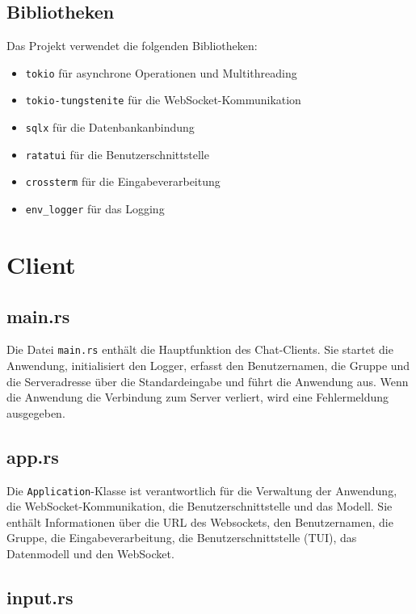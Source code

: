 \documentclass[a4paper]{article}
\begin{document}
\subsection{Bibliotheken}

Das Projekt verwendet die folgenden Bibliotheken:

\begin{itemize}
    \setlength\itemsep{0em}
    \item \texttt{tokio} für asynchrone Operationen und Multithreading
    \item \texttt{tokio-tungstenite} für die WebSocket-Kommunikation
    \item \texttt{sqlx} für die Datenbankanbindung
    \item \texttt{ratatui} für die Benutzerschnittstelle
    \item \texttt{crossterm} für die Eingabeverarbeitung
    \item \texttt{env\_logger} für das Logging
\end{itemize}

\newpage

\section{Client}

\subsection{main.rs}

Die Datei \texttt{main.rs} enthält die Hauptfunktion des Chat-Clients. Sie startet die Anwendung, initialisiert den Logger, erfasst den Benutzernamen, die Gruppe und die Serveradresse über die Standardeingabe und führt die Anwendung aus. Wenn die Anwendung die Verbindung zum Server verliert, wird eine Fehlermeldung ausgegeben.

\subsection{app.rs}

Die \texttt{Application}-Klasse ist verantwortlich für die Verwaltung der Anwendung, die WebSocket-Kommunikation, die Benutzerschnittstelle und das Modell. Sie enthält Informationen über die URL des Websockets, den Benutzernamen, die Gruppe, die Eingabeverarbeitung, die Benutzerschnittstelle (TUI), das Datenmodell und den WebSocket.


\subsection{input.rs}
\end{document}
